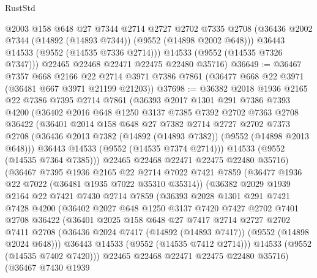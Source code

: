 \begin{lexlean}{RustStd}
\begin{coremodule}
          @2003
          @158
          @648
          @27
          @7344
          @2714
          @2727
          @2702
          @7335
          @2708
          (@36436 @2002 @7344 (@14892 (@14893 @7344)) (@9552 (@14898 @2002 @648)))
          @36443
          @14533
          (@9552 (@14535 @7336 @2714)))
        @14533
        (@9552 (@14535 @7326 @7347)))
      @22465
      @22468
      @22471
      @22475
      @22480
      @35716)
@36649 := @36467
    @7357
    @668
    @2166
    @22
    @2714
    @3971
    @7386
    @7861
    (@36477 @668 @22 @3971 (@36481 @667 @3971 @21199 @21203))
@37698 := @36382
    @2018
    @1936
    @2165
    @22
    @7386
    @7395
    @2714
    @7861
    (@36393
      @2017
      @1301
      @291
      @7386
      @7393
      @4200
      (@36402
        @2016
        @648
        @1250
        @3137
        @7385
        @7392
        @2702
        @7363
        @2708
        @36422
        (@36401
          @2014
          @158
          @648
          @27
          @7382
          @2714
          @2727
          @2702
          @7373
          @2708
          (@36436 @2013 @7382 (@14892 (@14893 @7382)) (@9552 (@14898 @2013 @648)))
          @36443
          @14533
          (@9552 (@14535 @7374 @2714)))
        @14533
        (@9552 (@14535 @7364 @7385)))
      @22465
      @22468
      @22471
      @22475
      @22480
      @35716)
    (@36467
      @7395
      @1936
      @2165
      @22
      @2714
      @7022
      @7421
      @7859
      (@36477 @1936 @22 @7022 (@36481 @1935 @7022 @35310 @35314))
      (@36382
        @2029
        @1939
        @2164
        @22
        @7421
        @7430
        @2714
        @7859
        (@36393
          @2028
          @1301
          @291
          @7421
          @7428
          @4200
          (@36402
            @2027
            @648
            @1250
            @3137
            @7420
            @7427
            @2702
            @7401
            @2708
            @36422
            (@36401
              @2025
              @158
              @648
              @27
              @7417
              @2714
              @2727
              @2702
              @7411
              @2708
              (@36436 @2024 @7417 (@14892 (@14893 @7417)) (@9552 (@14898 @2024 @648)))
              @36443
              @14533
              (@9552 (@14535 @7412 @2714)))
            @14533
            (@9552 (@14535 @7402 @7420)))
          @22465
          @22468
          @22471
          @22475
          @22480
          @35716)
        (@36467
          @7430
          @1939

\end{coremodule}
\end{lexlean}
